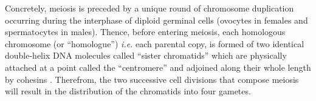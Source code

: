 




Concretely, meiosis is preceded by a unique round of chromosome duplication occurring during the interphase of diploid germinal cells (ovocytes in females and spermatocytes in males).
Thence, before entering meiosis, each homologous chromosome (or “homologue”) \textit{i.e.} each parental copy, is formed of two identical double-helix DNA molecules called “sister chromatids” which are physically attached at a point called the “centromere” and adjoined along their whole length by cohesins \citep{klein1999central}.
Therefrom, the two successive cell divisions that compose meiosis will result in the distribution of the chromatids into four gametes.

